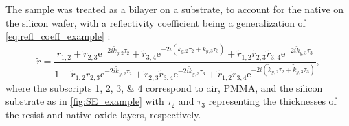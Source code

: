 The sample was treated as a bilayer on a substrate, to account for the native  on the silicon wafer, with a reflectivity coefficient being a generalization of \cref{eq:refl_coeff_example} \cite{Gibaud2009}: 
\begin{equation}\label{eq:refl_coeff_bilayer}
 \tilde{r} = \frac{\tilde{r}_{1,2} + \tilde{r}_{2,3} \mathrm{e}^{-2 i \tilde{k}_{y,2} \tau_2} + \tilde{r}_{3,4} \mathrm{e}^{-2 i \left( \tilde{k}_{y,2} \tau_2 + \tilde{k}_{y,3} \tau_3 \right)} + \tilde{r}_{1,2} \tilde{r}_{2,3} \tilde{r}_{3,4} \mathrm{e}^{-2 i \tilde{k}_{y,3} \tau_3} }{1 + \tilde{r}_{1,2} \tilde{r}_{2,3} \mathrm{e}^{-2 i \tilde{k}_{y,2} \tau_2} + \tilde{r}_{2,3} \tilde{r}_{3,4} \mathrm{e}^{-2 i \tilde{k}_{y,3} \tau_3} + \tilde{r}_{1,2} \tilde{r}_{3,4} \mathrm{e}^{-2 i \left( \tilde{k}_{y,2} \tau_2 + \tilde{k}_{y,3} \tau_3 \right)}} ,
 \end{equation}
where the subscripts \numlist{1;2;3;4} correspond to air, PMMA,  and the silicon substrate as in \cref{fig:SE_example} with $\tau_2$ and $\tau_3$ representing the thicknesses of the resist and native-oxide layers, respectively. 

